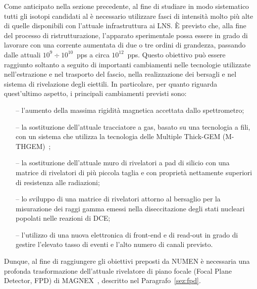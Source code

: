 Come anticipato nella sezione precedente, al fine di studiare in modo sistematico tutti gli isotopi candidati al \doppiobeta{} è necessario utilizzare fasci di intensità molto più alte di quelle disponibili con l'attuale infrastruttura ai LNS. %
È previsto che, alla fine del processo di ristrutturazione, l'apparato sperimentale possa essere in grado di lavorare con una corrente aumentata di due o tre ordini di grandezza, passando dalle attuali $10^{9} \div 10^{10}$~pps a circa $10^{12}$~pps.
Questo obiettivo può essere raggiunto soltanto a seguito di importanti cambiamenti nelle tecnologie utilizzate nell'estrazione e nel trasporto del fascio, nella realizzazione dei bersagli e nel sistema di rivelazione degli eiettili. 
In particolare, per quanto riguarda quest'ultimo aspetto, i principali cambiamenti previsti sono:
\begin{itemize}
	\item[--] l'aumento della massima rigidità magnetica accettata dallo spettrometro;
	\item[--] la sostituzione dell'attuale tracciatore a gas, basato su una tecnologia a fili, con un sistema che utilizza la tecnologia delle Multiple Thick-GEM (M-THGEM)~\cite{cortesi:rsi17};
	\item[--] la sostituzione dell'attuale muro di rivelatori a pad di silicio con una matrice di rivelatori di più piccola taglia e con proprietà nettamente superiori di resistenza alle radiazioni;
	\item[--] lo sviluppo di una matrice di rivelatori attorno al bersaglio per la misurazione dei raggi gamma emessi nella diseccitazione degli stati nucleari popolati nelle reazioni di DCE;
	\item[--] l'utilizzo di una nuova elettronica di front-end e di read-out in grado di gestire l'elevato tasso di eventi e l'alto numero di canali previsto.
\end{itemize}
Dunque, al fine di raggiungere gli obiettivi preposti da NUMEN è necessaria una profonda trasformazione dell'attuale rivelatore di piano focale (Focal Plane Detector, FPD) di MAGNEX~\cite{cavallaro:epja12}, descritto nel Paragrafo~\ref{sez:fpd}.


